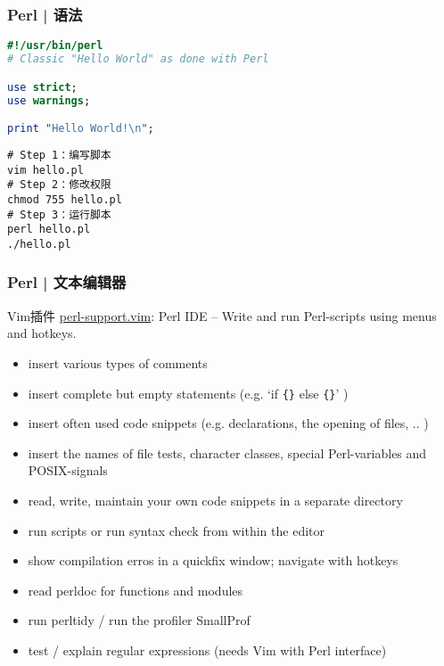 \begin{frame}[fragile]
  \frametitle{Perl | \alert{语法}}
\begin{lstlisting}[language=Perl]
#!/usr/bin/perl
# Classic "Hello World" as done with Perl

use strict;
use warnings;

print "Hello World!\n";
\end{lstlisting}
\pause
\begin{lstlisting}
# Step 1：编写脚本
vim hello.pl
# Step 2：修改权限
chmod 755 hello.pl
# Step 3：运行脚本
perl hello.pl
./hello.pl
\end{lstlisting}
\end{frame}

\begin{frame}[fragile]
  \frametitle{Perl | 文本编辑器}
  \begin{block}{Vim插件}
    \href{https://github.com/vim-scripts/perl-support.vim}{perl-support.vim}: Perl IDE -- Write and run Perl-scripts using menus and hotkeys.
  \end{block}
  {\footnotesize
  \begin{itemize}
    \item insert various types of comments
    \item insert complete but empty statements (e.g. `if \verb|{}| else \verb|{}|' )
    \item insert often used code snippets (e.g. declarations, the opening of files, .. )
    \item insert the names of file tests, character classes, special Perl-variables and POSIX-signals
    \item read, write, maintain your own code snippets in a separate directory
    \item run scripts or run syntax check from within the editor
    \item show compilation erros in a quickfix window; navigate with hotkeys 
    \item read perldoc for functions and modules 
    \item run perltidy / run the profiler SmallProf
    \item test / explain regular expressions (needs Vim with Perl interface)
  \end{itemize}
}
\end{frame}

